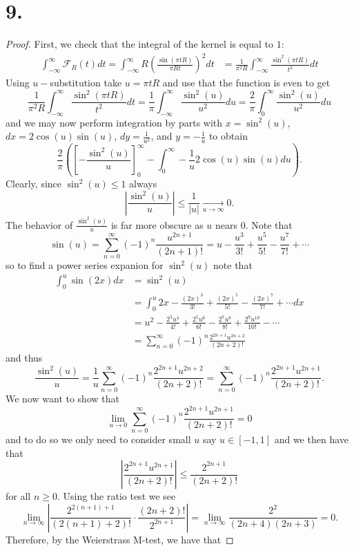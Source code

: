 \documentclass{article}
\begin{document}
\section*{9.}
\begin{proof}
   First, we check that the integral of the kernel is equal to $1$:
   \begin{align*}
    \int_{-\infty}^{\infty}  \mathcal{F}_R(t) dt = \int_{-\infty}^{\infty} R \left(\frac{\sin( \pi t R)}{\pi R t}\right)^2 dt &= \frac{1}{\pi^2 R}\int_{-\infty}^{\infty} \frac{\sin^2(\pi t R)}{t^2}dt 
   \end{align*} 
   Using $u-$substitution take $u = \pi t R$ and use that the function is even to get
   \[
    \frac{1}{\pi^2 R}\int_{-\infty}^{\infty} \frac{\sin^2(\pi t R)}{t^2}dt = \frac{1}{\pi} \int_{-\infty}^{\infty} \frac{\sin^2(u)}{u^2} du = \frac{2}{\pi}\int_0^{\infty} \frac{\sin^2(u)}{u^2}du
   \]
   and we may now perform integration by parts with $x = \sin^2(u)$, $dx = 2 \cos(u)\sin(u)$, $dy = \frac{1}{u^2}$, and $y = -\frac{1}{u}$ to obtain
   \[
   \frac{2}{\pi}\left(\left[-\frac{\sin^2(u)}{u}\right]_0^{\infty} - \int_0^{\infty} -\frac{1}{u}2\cos(u)\sin(u) du \right). 
   \]
   Clearly, since $\sin^{2}(u) \leq 1$ always
   \[
   \left|\frac{\sin^2(u)}{u}\right| \leq \frac{1}{|u|} \xrightarrow[u \to \infty]{} 0.  
   \]
   The behavior of $\frac{\sin^2(u)}{u}$ is far more obscure as $u$ nears $0$. Note that 
   \[
   \sin(u) =  \sum\limits_{n = 0}^{\infty}(-1)^n \frac{u^{2n + 1}}{(2n + 1)!} = u - \frac{u^3}{3!} + \frac{u^5}{5!} - \frac{u^7}{7!} + \cdots 
   \]
   so to find a power series expanion for $\sin^2(u)$ note that 
   \begin{align*}
    \int_0^u \sin(2x) dx &= \sin^2(u)\\
     &= \int_0^u2x - \frac{(2x)^3}{3!} + \frac{(2x)^5}{5!} - \frac{(2x)^7}{7!} + \cdots dx \\
     &= u^2 - \frac{2^3u^4}{4!} + \frac{2^5u^6}{6!} - \frac{2^7u^8}{8!} + \frac{2^9u^{10}}{10!} - \cdots \\
     &= \sum\limits_{n = 0}^{\infty} (-1)^n \frac{2^{2n + 1}u^{2n + 2}}{(2n + 2)!}
   \end{align*}
   and thus 
   \[
   \frac{\sin^2(u)}{u} = \frac{1}{u} \sum\limits_{n = 0}^{\infty} (-1)^n \frac{2^{2n + 1}u^{2n + 2}}{(2n + 2)!} = \sum\limits_{n = 0}^{\infty} (-1)^n \frac{2^{2n + 1}u^{2n + 1}}{(2n + 2)!}. 
   \]
   We now want to show that 
   \[
   \lim\limits_{u \to 0}\sum\limits_{n = 0}^{\infty} (-1)^n \frac{2^{2n + 1}u^{2n + 1}}{(2n + 2)!} = 0 
   \]
    and to do so we only need to consider small $u$ say $u \in [-1, 1]$ and we then have that 
    \[
    \left| \frac{2^{2n + 1}u^{2n + 1}}{(2n + 2)!} \right| \leq \frac{2^{2n + 1}}{(2n + 2)!}     
    \]
    for all $n \geq 0$. Using the ratio test we see
    \[
    \lim\limits_{n \to \infty}\left|\frac{2^{2(n + 1) + 1}}{(2(n + 1)+ 2)!} \cdot \frac{(2n + 2)!}{2^{2n + 1}}\right| = \lim\limits_{n \to \infty} \frac{2^2}{(2n + 4)(2n + 3)} = 0.    
    \]
    Therefore, by the Weierstrass M-test, we have that 


\end{proof}
\end{document}
